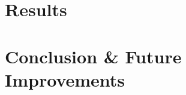 \documentclass[twocolumn]{article}
\begin{document}
\section{Results}\label{sec:results}


\section{Conclusion \& Future Improvements}\label{sec:conclusion}

\end{document}
